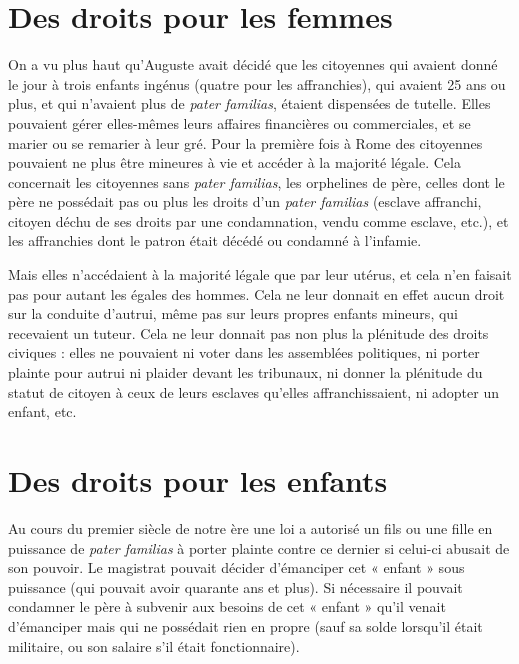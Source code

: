 
\section{Des droits pour les femmes}

 On a vu plus haut qu'Auguste avait décidé que les citoyennes qui avaient donné le jour à trois enfants ingénus (quatre pour les affranchies), qui avaient 25 ans ou plus, et qui n'avaient plus de \emph{pater familias}, étaient dispensées de tutelle. Elles pouvaient gérer elles-mêmes leurs affaires financières ou commerciales, et se marier ou se remarier à leur gré. Pour la première fois à Rome des citoyennes pouvaient ne plus être mineures à vie et accéder à la majorité légale. Cela concernait les citoyennes sans \emph{pater familias}, les orphelines de père, celles dont le père ne possédait pas ou plus les droits d'un \emph{pater familias} (esclave affranchi, citoyen déchu de ses droits par une condamnation, vendu comme esclave, etc.), et les affranchies dont le patron était décédé ou condamné à l'infamie. 

 Mais elles n'accédaient à la majorité légale que par leur utérus, et cela n'en faisait pas pour autant les égales des hommes. Cela ne leur donnait en effet aucun droit sur la conduite d'autrui, même pas sur leurs propres enfants mineurs, qui recevaient un tuteur. Cela ne leur donnait pas non plus la plénitude des droits civiques : elles ne pouvaient ni voter dans les assemblées politiques, ni porter plainte pour autrui ni plaider devant les tribunaux, ni donner la plénitude du statut de citoyen à ceux de leurs esclaves qu'elles affranchissaient, ni adopter un enfant, etc.
 
\section{Des droits pour les enfants}

 Au cours du premier siècle de notre ère une loi a autorisé un fils ou une fille en puissance de \emph{pater familias} à porter plainte contre ce dernier si celui-ci abusait de son pouvoir. Le magistrat pouvait décider d'émanciper cet « enfant » sous puissance (qui pouvait avoir quarante ans et plus). Si nécessaire il pouvait condamner le père à subvenir aux besoins de cet « enfant » qu'il venait d'émanciper mais qui ne possédait rien en propre (sauf sa solde lorsqu'il était militaire, ou son salaire s'il était fonctionnaire). 
 
